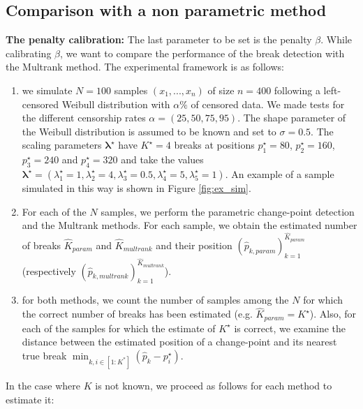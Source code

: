 \subsection{Comparison with a non parametric method}

\textbf{The penalty calibration:} The last parameter to be set is the penalty $\beta$. While calibrating $\beta$, we want to compare the performance of the break detection with the Multrank method. The experimental framework is as follows: 
    \begin{enumerate}
        \item we simulate $N=100$ samples $(x_1,...,x_n)$ of size $n=400$  following a left-censored Weibull distribution with $\alpha\%$ of censored data. We made tests for the different censorship rates $\alpha = (25,50,75,95)$. The shape parameter of the Weibull distribution is assumed to be known and set to $\sigma=0.5$. The scaling parameters $\bm{\lambda^\star}$ have $K^\star=4$ breaks at positions $p^\star_1 = 80$, $p^\star_2 = 160$, $p^\star_3 = 240$ and $p^\star_4 = 320$ and take the values $\bm{\lambda^\star}=(\lambda^\star_1 = 1, \lambda^\star_2 = 4, \lambda^\star_3 = 0.5, \lambda^\star_4 = 5, \lambda^\star_5 = 1)$. An example of a sample simulated in this way is shown in Figure \ref{fig:ex_sim}.
        \item For each of the $N$ samples, we perform the parametric change-point detection and the Multrank methods. For each sample, we obtain the estimated number of breaks $\hat K_{param}$ and $\hat K_{multrank}$ and their position $(\hat{p}_{k,param})_{k = 1}^{\hat K_{param}}$ (respectively $(\hat{p}_{k,multrank})_{k = 1}^{\hat K_{multrank}}$).
        \item for both methods, we count the number of samples among the $N$ for which the correct number of breaks has been estimated (e.g. $\hat K_{param} = K^\star$). Also, for each of the samples for which the estimate of $K^\star$ is correct, we examine the distance between the estimated position of a change-point and its nearest true break $\min_{k,i \in [1:K^*]}(\hat{p}_{k} - p^\star_i)$. 
    \end{enumerate}
    In the case where $K$ is not known, we proceed as follows for each method to estimate it:
